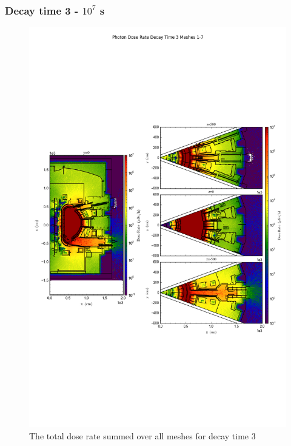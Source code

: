\documentclass[12pt]{article}
\begin{document}
\subsubsection{Decay time 3 - $10^7$ s}
\begin{figure}[ht!]
\centering
\includegraphics[trim={0cm 9cm 0cm 10cm},clip,scale=0.75]{../plots/final_model_with_b4c/Photon_Dose_Rate_Decay_Time_3_Meshes_1-7.png}
\caption{The total dose rate summed over all meshes for decay time 3}
\label{fig:photons_dc3_b4c_total}
\end{figure}
\end{document}
